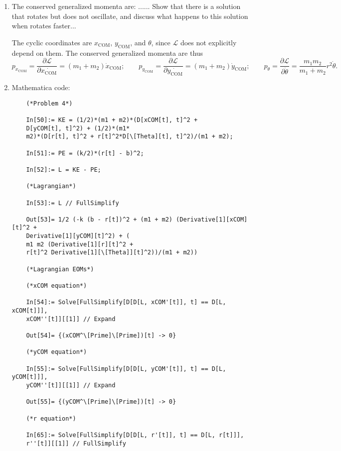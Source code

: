 \documentclass{article}
\theoremstyle{definition}
\newcommand{\p}{\partial}
\newcommand{\lag}{\mathcal{L}}
\newcommand{\f}[2]{\frac{#1}{#2}}
\begin{document}
\begin{enumerate}[label = (\alph*)]
	
	\item The conserved generalized momenta are: ...... Show that there is a solution that rotates but does not oscillate, and discuss what happens to this solution when rotates faster...
	
	The cyclic coordinates are $x_\text{COM}$, $y_\text{COM}$, and $\theta$, since $\lag$ does not explicitly depend on them. The conserved generalized momenta are thus
	\begin{equation*}
	p_{x_\text{COM}} = \f{\p \lag}{\p \dot{x_\text{COM}}} = (m_1+m_2)\dot{x}_\text{COM}; \quad\quad p_{y_\text{COM}} = \f{\p \lag}{\p \dot{y_\text{COM}}} = (m_1+m_2)\dot{y}_\text{COM}; \quad\quad
	p_\theta = \f{\p \lag}{\p \dot{\theta}} = \f{m_1m_2}{m_1+m_2} r^2\dot{\theta}.
	\end{equation*}
 
	
	
	
	\item Mathematica code:
	\begin{lstlisting}
	(*Problem 4*)
	
	In[50]:= KE = (1/2)*(m1 + m2)*(D[xCOM[t], t]^2 + 
	D[yCOM[t], t]^2) + (1/2)*(m1*
	m2)*(D[r[t], t]^2 + r[t]^2*D[\[Theta][t], t]^2)/(m1 + m2);
	
	In[51]:= PE = (k/2)*(r[t] - b)^2;
	
	In[52]:= L = KE - PE;
	
	(*Lagrangian*)
	
	In[53]:= L // FullSimplify
	
	Out[53]= 1/2 (-k (b - r[t])^2 + (m1 + m2) (Derivative[1][xCOM][t]^2 + 
	Derivative[1][yCOM][t]^2) + (
	m1 m2 (Derivative[1][r][t]^2 + 
	r[t]^2 Derivative[1][\[Theta]][t]^2))/(m1 + m2))
	
	(*Lagrangian EOMs*)
	
	(*xCOM equation*)
	
	In[54]:= Solve[FullSimplify[D[D[L, xCOM'[t]], t] == D[L, xCOM[t]]], 
	xCOM''[t]][[1]] // Expand
	
	Out[54]= {(xCOM^\[Prime]\[Prime])[t] -> 0}
	
	(*yCOM equation*)
	
	In[55]:= Solve[FullSimplify[D[D[L, yCOM'[t]], t] == D[L, yCOM[t]]], 
	yCOM''[t]][[1]] // Expand
	
	Out[55]= {(yCOM^\[Prime]\[Prime])[t] -> 0}
	
	(*r equation*)
	
	In[65]:= Solve[FullSimplify[D[D[L, r'[t]], t] == D[L, r[t]]], 
	r''[t]][[1]] // FullSimplify
	

\end{lstlisting}
\end{enumerate}
\end{document}
